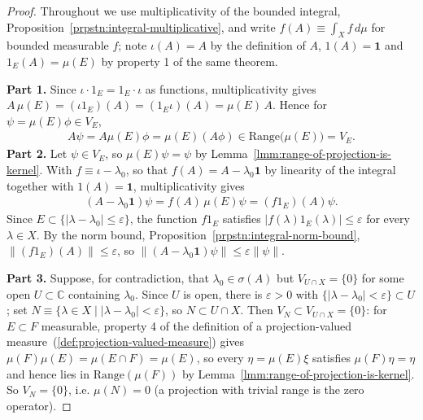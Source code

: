 \begin{proof}
    \leanok
Throughout we use multiplicativity of the bounded integral, Proposition~\ref{prpstn:integral-multiplicative}, and write $f(A) \equiv \int_X f\,d\mu$ for bounded measurable $f$; note $\iota(A) = A$ by the definition of $A$, $1(A) = \mathbf{1}$ and $1_E(A) = \mu(E)$ by property 1 of the same theorem.

\textbf{Part 1.} Since $\iota \cdot 1_E = 1_E \cdot \iota$ as functions, multiplicativity gives $A\,\mu(E) = (\iota 1_E)(A) = (1_E \iota)(A) = \mu(E)\,A$. Hence for $\psi = \mu(E)\phi \in V_E$,
\begin{align}
    A\psi = A\mu(E)\phi = \mu(E)(A\phi) \in \text{Range}\big(\mu(E)\big) = V_E.
\end{align}
\textbf{Part 2.} Let $\psi \in V_E$, so $\mu(E)\psi = \psi$ by Lemma~\ref{lmm:range-of-projection-is-kernel}. With $f \equiv \iota - \lambda_0$, so that $f(A) = A - \lambda_0\mathbf{1}$ by linearity of the integral together with $1(A) = \mathbf{1}$, multiplicativity gives
\begin{align}
    (A - \lambda_0\mathbf{1})\psi = f(A)\,\mu(E)\psi = (f 1_E)(A)\psi.
\end{align}
Since $E \subset \{ \lvert \lambda - \lambda_0 \rvert \le \varepsilon \}$, the function $f 1_E$ satisfies $\lvert f(\lambda)1_E(\lambda) \rvert \le \varepsilon$ for every $\lambda \in X$. By the norm bound, Proposition~\ref{prpstn:integral-norm-bound}, $\left\| (f1_E)(A) \right\| \le \varepsilon$, so $\left\| (A-\lambda_0\mathbf{1})\psi \right\| \le \varepsilon\left\| \psi \right\|$.

\textbf{Part 3.} Suppose, for contradiction, that $\lambda_0 \in \sigma(A)$ but $V_{U \cap X} = \{0\}$ for some open $U \subset \mathbb{C}$ containing $\lambda_0$. Since $U$ is open, there is $\varepsilon > 0$ with $\{ \lvert \lambda - \lambda_0 \rvert < \varepsilon \} \subset U$; set $N \equiv \{ \lambda \in X \mid \lvert \lambda - \lambda_0 \rvert < \varepsilon \}$, so $N \subset U \cap X$. Then $V_N \subset V_{U\cap X} = \{0\}$: for $E \subset F$ measurable, property 4 of the definition of a projection-valued measure~(\ref{def:projection-valued-measure}) gives $\mu(F)\mu(E) = \mu(E \cap F) = \mu(E)$, so every $\eta = \mu(E)\xi$ satisfies $\mu(F)\eta = \eta$ and hence lies in $\text{Range}(\mu(F))$ by Lemma~\ref{lmm:range-of-projection-is-kernel}. So $V_N = \{0\}$, i.e. $\mu(N) = 0$ (a projection with trivial range is the zero operator).


\end{proof}
